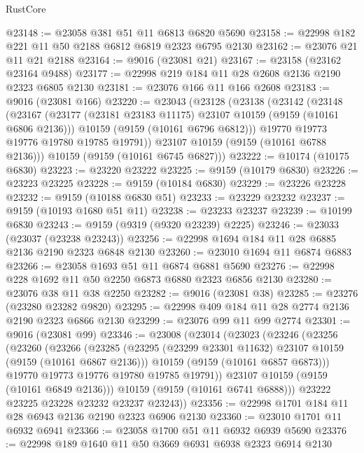 \begin{lexlean}{RustCore}
\begin{coremodule}
@23148 := @23058 @381 @51 @11 @6813 @6820 @5690
@23158 := @22998 @182 @221 @11 @50 @2188 @6812 @6819 @2323 @6795 @2130
@23162 := @23076 @21 @11 @21 @2188
@23164 := @9016 (@23081 @21)
@23167 := @23158 (@23162 @23164 @9488)
@23177 := @22998 @219 @184 @11 @28 @2608 @2136 @2190 @2323 @6805 @2130
@23181 := @23076 @166 @11 @166 @2608
@23183 := @9016 (@23081 @166)
@23220 := @23043
    (@23128
      (@23138
        (@23142
          (@23148
            (@23167
              (@23177 (@23181 @23183 @11175) @23107 @10159 (@9159 (@10161 @6806 @2136)))
              @10159
              (@9159 (@10161 @6796 @6812)))
            @19770
            @19773
            @19776
            @19780
            @19785
            @19791))
        @23107
        @10159
        (@9159 (@10161 @6788 @2136)))
      @10159
      (@9159 (@10161 @6745 @6827)))
@23222 := @10174 (@10175 @6830)
@23223 := @23220 @23222
@23225 := @9159 (@10179 @6830)
@23226 := @23223 @23225
@23228 := @9159 (@10184 @6830)
@23229 := @23226 @23228
@23232 := @9159 (@10188 @6830 @51)
@23233 := @23229 @23232
@23237 := @9159 (@10193 @1680 @51 @11)
@23238 := @23233 @23237
@23239 := @10199 @6830
@23243 := @9159 (@9319 (@9320 @23239) @2225)
@23246 := @23033 (@23037 (@23238 @23243))
@23256 := @22998 @1694 @184 @11 @28 @6885 @2136 @2190 @2323 @6848 @2130
@23260 := @23010 @1694 @11 @6874 @6883
@23266 := @23058 @1693 @51 @11 @6874 @6881 @5690
@23276 := @22998 @228 @1692 @11 @50 @2250 @6873 @6880 @2323 @6856 @2130
@23280 := @23076 @38 @11 @38 @2250
@23282 := @9016 (@23081 @38)
@23285 := @23276 (@23280 @23282 @9820)
@23295 := @22998 @409 @184 @11 @28 @2774 @2136 @2190 @2323 @6866 @2130
@23299 := @23076 @99 @11 @99 @2774
@23301 := @9016 (@23081 @99)
@23346 := @23008
    (@23014
      (@23023
        (@23246
          (@23256
            (@23260
              (@23266
                (@23285
                  (@23295 (@23299 @23301 @11632) @23107 @10159 (@9159 (@10161 @6867 @2136)))
                  @10159
                  (@9159 (@10161 @6857 @6873)))
                @19770
                @19773
                @19776
                @19780
                @19785
                @19791))
            @23107
            @10159
            (@9159 (@10161 @6849 @2136)))
          @10159
          (@9159 (@10161 @6741 @6888)))
        @23222
        @23225
        @23228
        @23232
        @23237
        @23243))
@23356 := @22998 @1701 @184 @11 @28 @6943 @2136 @2190 @2323 @6906 @2130
@23360 := @23010 @1701 @11 @6932 @6941
@23366 := @23058 @1700 @51 @11 @6932 @6939 @5690
@23376 := @22998 @189 @1640 @11 @50 @3669 @6931 @6938 @2323 @6914 @2130

\end{coremodule}
\end{lexlean}
